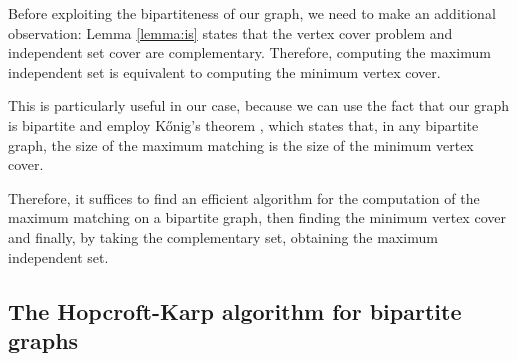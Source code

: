 Before exploiting the bipartiteness of our graph, we need to make an additional observation: Lemma \ref{lemma:is} states that the vertex cover problem and independent set cover are complementary. Therefore, computing the maximum independent set is equivalent to computing the minimum vertex cover.

This is particularly useful in our case, because we can use the fact that our graph is bipartite and employ K\H{o}nig's theorem \cite{konig}, which states that, in any bipartite graph, the size of the maximum matching is the size of the minimum vertex cover.

Therefore, it suffices to find an efficient algorithm for the computation of the maximum matching on a bipartite graph, then finding the minimum vertex cover and finally, by taking the complementary set, obtaining the maximum independent set.

\subsection{The Hopcroft-Karp algorithm for bipartite graphs}

